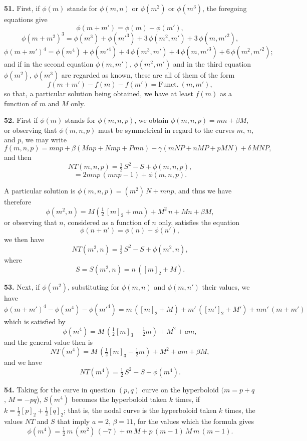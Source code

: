\documentclass[11pt,a4paper]{article}
\begin{document}
\medskip

\textbf{51.} First, if $\phi(m)$ stands for $\phi(m, n)$ or $\phi(m^2)$ or $\phi(m^3)$, the foregoing equations give
\[
\phi(m + m') = \phi(m) + \phi(m'),
\]
\[
\phi(m + m^2)^3 = \phi(m^3) + \phi(m'^3) + 3\,\phi(m^2, m') + 3\,\phi(m, m'^2),
\]
\[
\phi(m + m')^4 = \phi(m^4) + \phi(m'^4) + 4\,\phi(m^3, m') + 4\,\phi(m, m'^3) + 6\,\phi(m^2, m'^2);
\]
and if in the second equation $\phi(m, m')$, $\phi(m^2, m')$ and in the third equation $\phi(m^2)$, $\phi(m^3)$ are regarded as known, these are all of them of the form
\[
f(m + m') - f(m) - f(m') = \text{Funct.}\ (m, m'),
\]
so that, a particular solution being obtained, we have at least $f(m)$ as a function of $m$ and $M$ only.

\medskip

\textbf{52.} First if $\phi(m)$ stands for $\phi(m, n, p)$, we obtain $\phi(m, n, p) = mn + \beta M$, or observing that $\phi(m, n, p)$ must be symmetrical in regard to the curves $m$, $n$, and $p$, we may write
\[
f(m, n, p) = mnp + \beta(Mnp + Nmp + Pmn) + \gamma(mNP + nMP + pMN) + \delta\,MNP,
\]
and then
\[
NT(m, n, p) = \tfrac{1}{2}\,S^2 - S + \phi(m, n, p),
\]
\[
= 2mnp\,(mnp - 1) + \phi(m, n, p).
\]

\medskip

\noindent A particular solution is $\phi(m, n, p) = (m^2)\,N + mnp$, and thus we have therefore
\[
\phi(m^2, n) = M(\tfrac{1}{2}\,[m]_2 + mn) + M^2\,n + Mn + \beta M,
\]
or observing that $n$, considered as a function of $n$ only, satisfies the equation
\[
\phi(n + n') = \phi(n) + \phi(n'),
\]
we then have
\[
NT(m^2, n) = \tfrac{1}{2}\,S^2 - S + \phi(m^2, n),
\]
where
\[
S = S(m^2, n) = n\,([m]_2 + M).
\]

\medskip

\textbf{53.} Next, if $\phi(m^2)$, substituting for $\phi(m, n)$ and $\phi(m, n')$ their values, we have
\[
\phi(m + m')^4 - \phi(m^4) - \phi(m'^4) = m\,([m]_2 + M) + m'\,([m']_2 + M') + mn'\,(m + m')
\]
which is satisfied by
\[
\phi(m^4) = M\,(\tfrac{1}{2}[m]_3 - \tfrac{1}{2}m) + M^2 + a m,
\]
and the general value then is
\[
NT(m^4) = M\,(\tfrac{1}{2}[m]_3 - \tfrac{1}{2}m) + M^2 + a m + \beta M,
\]
and we have
\[
NT(m^4) = \tfrac{1}{2}\,S^2 - S + \phi(m^4).
\]

\medskip

\textbf{54.} Taking for the curve in question $(p, q)$ curve on the hyperboloid $(m=p+q$, $M=-pq$), $S(m^4)$ becomes the hyperboloid taken $k$ times, if $k = \tfrac{1}{2}[p]_2 + \tfrac{1}{2}[q]_2$; that is, the nodal curve is the hyperboloid taken $k$ times, the values $NT$ and $S$ that imply $a=2$, $\beta=11$, for the values which the formula gives
\[
\phi(m^4) = \tfrac{1}{2}\,m\,(m^2)\,(-7) + m\,M + p\,(m-1)\,M\,m\,(m-1).
\]
\end{document}
